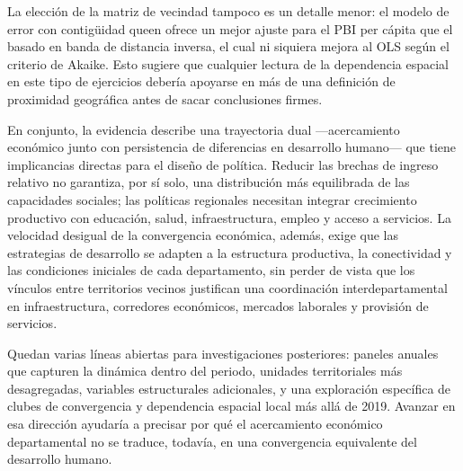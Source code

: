 La elección de la matriz de vecindad tampoco es un detalle menor: el modelo
de error con contigüidad queen ofrece un mejor ajuste para el PBI per
cápita que el basado en banda de distancia inversa, el cual ni siquiera
mejora al OLS según el criterio de Akaike. Esto sugiere que cualquier
lectura de la dependencia espacial en este tipo de ejercicios debería
apoyarse en más de una definición de proximidad geográfica antes de sacar
conclusiones firmes.
 
En conjunto, la evidencia describe una trayectoria dual —acercamiento
económico junto con persistencia de diferencias en desarrollo humano— que
tiene implicancias directas para el diseño de política. Reducir las brechas
de ingreso relativo no garantiza, por sí solo, una distribución más
equilibrada de las capacidades sociales; las políticas regionales necesitan
integrar crecimiento productivo con educación, salud, infraestructura,
empleo y acceso a servicios. La velocidad desigual de la convergencia
económica, además, exige que las estrategias de desarrollo se adapten a la
estructura productiva, la conectividad y las condiciones iniciales de cada
departamento, sin perder de vista que los vínculos entre territorios
vecinos justifican una coordinación interdepartamental en infraestructura,
corredores económicos, mercados laborales y provisión de servicios.
 
Quedan varias líneas abiertas para investigaciones posteriores: paneles
anuales que capturen la dinámica dentro del periodo, unidades territoriales
más desagregadas, variables estructurales adicionales, y una exploración
específica de clubes de convergencia y dependencia espacial local más allá
de 2019. Avanzar en esa dirección ayudaría a precisar por qué el
acercamiento económico departamental no se traduce, todavía, en una
convergencia equivalente del desarrollo humano.
